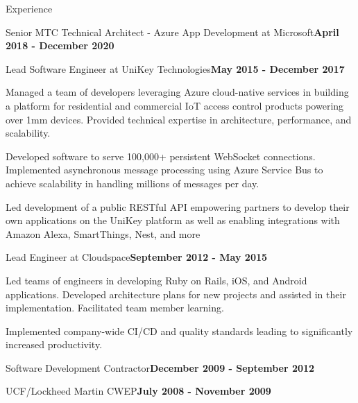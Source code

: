 \documentclass{resume} %
\begin{document}
\begin{rSection}{Experience}
\begin{rSubsection}{Senior MTC Technical Architect - Azure App Development at Microsoft}{\bf April 2018 - December 2020}{}{}
\end{rSubsection}


\begin{rSubsection}{Lead Software Engineer at UniKey Technologies}{\bf May 2015 - December 2017}{}{}

\item Managed a team of developers leveraging Azure cloud-native services in building a platform for residential and commercial IoT access control products powering over 1mm devices.  Provided technical expertise in architecture, performance, and scalability.
\item Developed software to serve 100,000+ persistent WebSocket connections. Implemented asynchronous message processing using Azure Service Bus to achieve scalability in handling millions of messages per day.
\item Led development of a public RESTful API empowering partners to develop their own applications on the UniKey platform as well as enabling integrations with Amazon Alexa, SmartThings, Nest, and more

\end{rSubsection}


\begin{rSubsection}{Lead Engineer at Cloudspace}{\bf September 2012 - May 2015}{}{}

\item Led teams of engineers in developing Ruby on Rails, iOS, and Android applications.  Developed architecture plans for new projects and assisted in their implementation. Facilitated team member learning.
\item Implemented company-wide CI/CD and quality standards leading to significantly increased productivity.
    
\end{rSubsection}


\begin{rSubsectionTitleOnly}{Software Development Contractor}{\bf December 2009 - September 2012}{}{}
\end{rSubsectionTitleOnly}


\begin{rSubsectionTitleOnly}{UCF/Lockheed Martin CWEP}{\bf July 2008 - November 2009}{}{}
\end{rSubsectionTitleOnly}


\end{rSection}
\end{document}
